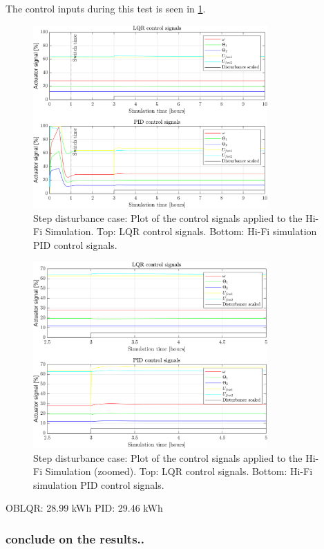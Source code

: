 The control inputs during this test is seen in \cref{fig:inputs_stepDist}.

\begin{figure}[H]
	\centering
	\includegraphics[width=0.8\textwidth]{Graphics/fig_inputs_stepDist.png}
	\caption{Step disturbance case: Plot of the control signals applied to the Hi-Fi Simulation. Top: LQR control signals. Bottom: Hi-Fi simulation PID control signals.}
	\label{fig:inputs_stepDist}
\end{figure}

\begin{figure}[H]
	\centering
	\includegraphics[width=0.8\textwidth]{Graphics/fig_inputs_stepDist_zoom.png}
	\caption{Step disturbance case: Plot of the control signals applied to the Hi-Fi Simulation (zoomed). Top: LQR control signals. Bottom: Hi-Fi simulation PID control signals.}
	\label{fig:inputs_stepDist_zoom}
\end{figure}


OBLQR: 28.99 kWh
PID: 29.46 kWh

\subsubsection{conclude on the results.. }